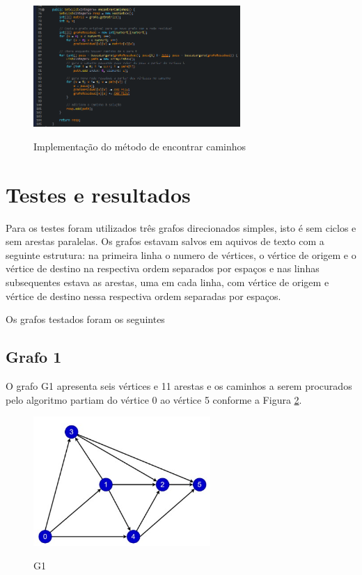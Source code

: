 \begin{figure}[H]
    \centering
    \caption{Implementação do método de encontrar caminhos}
    \includegraphics[width=0.7\textwidth]{figuras/encontrarCaminhos.png}
    \label{encontrar-caminhos}
\end{figure}

\section{\esp Testes e resultados}

Para os testes foram utilizados três grafos direcionados simples, isto é sem ciclos e sem arestas paralelas. Os grafos estavam salvos em aquivos de texto com  a seguinte estrutura:
na primeira linha o numero de vértices, o vértice de origem e o vértice de destino na respectiva ordem separados por espaços e nas linhas subsequentes  estava as arestas, uma em cada linha, com vértice de origem e vértice de destino nessa respectiva ordem separadas por espaços.

Os grafos testados foram os seguintes

\subsection{\esp Grafo 1}

O grafo G1 apresenta seis vértices e 11 arestas e os caminhos a serem procurados pelo algoritmo partiam do vértice 0 ao vértice 5 conforme a Figura \ref{grafo1}.
\begin{figure}[H]
	\centering	
	\caption[\hspace{0.1cm}]{G1}
	\vspace{-0.4cm}
	\includegraphics[width=0.6\textwidth]{figuras/grafo1.png}
	\label{grafo1}
\end{figure}
    
